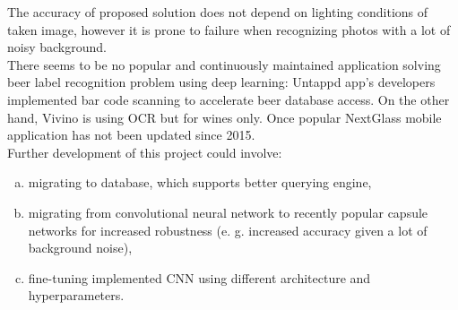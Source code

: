 \documentclass[11pt, a4paper]{article}
\begin{document}
The accuracy of proposed solution does not depend on lighting conditions of taken image, however it is prone to failure when recognizing photos with a lot of noisy background.\\

There seems to be no popular and continuously maintained application solving beer label recognition problem using deep learning: Untappd app's developers implemented bar code scanning to accelerate beer database access. On the other hand, Vivino is using OCR but for wines only. Once popular NextGlass mobile application has not been updated since 2015. \\

Further development of this project could involve: 
\begin{enumerate}[a)]
\item migrating to database, which supports better querying engine,
\item migrating from convolutional neural network to recently popular capsule networks for increased robustness (e. g. increased accuracy given a lot of background noise),
\item fine-tuning implemented CNN using different architecture and hyperparameters.
\end{enumerate}
\clearpage



\clearpage

\listoffigures
\end{document}
